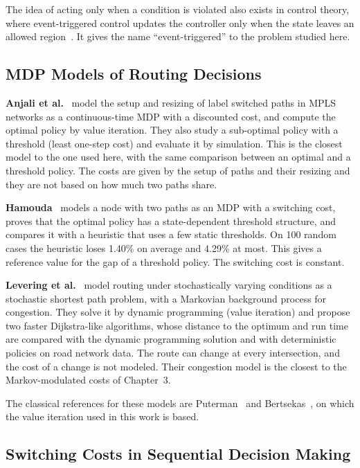 \documentclass[11pt,a4paper]{article}
\begin{document}
The idea of acting only when a condition is violated also exists in control theory, where event-triggered control updates the controller only when the state leaves an allowed region~\cite{heemels2012}. It gives the name ``event-triggered'' to the problem studied here.

\subsection{MDP Models of Routing Decisions}

\textbf{Anjali et al.}~\cite{anjali2002} model the setup and resizing of label switched paths in MPLS networks as a continuous-time MDP with a discounted cost, and compute the optimal policy by value iteration. They also study a sub-optimal policy with a threshold (least one-step cost) and evaluate it by simulation. This is the closest model to the one used here, with the same comparison between an optimal and a threshold policy. The costs are given by the setup of paths and their resizing and they are not based on how much two paths share.

\textbf{Hamouda}~\cite{hamouda2020} models a node with two paths as an MDP with a switching cost, proves that the optimal policy has a state-dependent threshold structure, and compares it with a heuristic that uses a few static thresholds. On 100 random cases the heuristic loses 1.40\% on average and 4.29\% at most. This gives a reference value for the gap of a threshold policy. The switching cost is constant.

\textbf{Levering et al.}~\cite{levering2022} model routing under stochastically varying conditions as a stochastic shortest path problem, with a Markovian background process for congestion. They solve it by dynamic programming (value iteration) and propose two faster Dijkstra-like algorithms, whose distance to the optimum and run time are compared with the dynamic programming solution and with deterministic policies on road network data. The route can change at every intersection, and the cost of a change is not modeled. Their congestion model is the closest to the Markov-modulated costs of Chapter~3.

The classical references for these models are Puterman~\cite{puterman1994} and Bertsekas~\cite{bertsekas}, on which the value iteration used in this work is based.

\subsection{Switching Costs in Sequential Decision Making}
\end{document}
